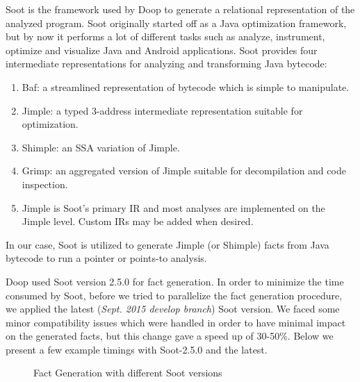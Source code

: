 \documentclass{dithesis}
\begin{document}
    Soot \cite{Sable: Soot} is the framework used by Doop to generate a relational representation of the analyzed program. Soot originally started off as a Java optimization framework, but by now it performs a lot of different tasks such as analyze, instrument, optimize and visualize Java and Android applications. Soot provides four intermediate representations for analyzing and transforming Java bytecode:
	\begin{enumerate}
		\item Baf: a streamlined representation of bytecode which is simple to manipulate.
		\item Jimple: a typed 3-address intermediate representation suitable for optimization.
		\item Shimple: an SSA variation of Jimple.
		\item Grimp: an aggregated version of Jimple suitable for decompilation and code inspection.
		\item Jimple is Soot’s primary IR and most analyses are implemented on the Jimple level. Custom IRs may be added when desired.
	\end{enumerate}
    In our case, Soot is utilized to generate Jimple (or Shimple) facts from Java bytecode to run a pointer or points-to analysis.
    

    	Doop used Soot version 2.5.0 for fact generation. In order to minimize the time consumed by Soot, before we tried to parallelize the fact generation procedure, we applied the latest (\textit{Sept. 2015 develop branch}) Soot version. We faced some minor compatibility issues which were handled in order to have minimal impact on the generated facts, but this change gave a speed up of 30-50\%. Below we present a few example timings with Soot-2.5.0 and the latest.

		\begin{figure}[H]
			\centering
{}
			\caption{Fact Generation with different Soot versions}
		\end{figure}
\end{document}
